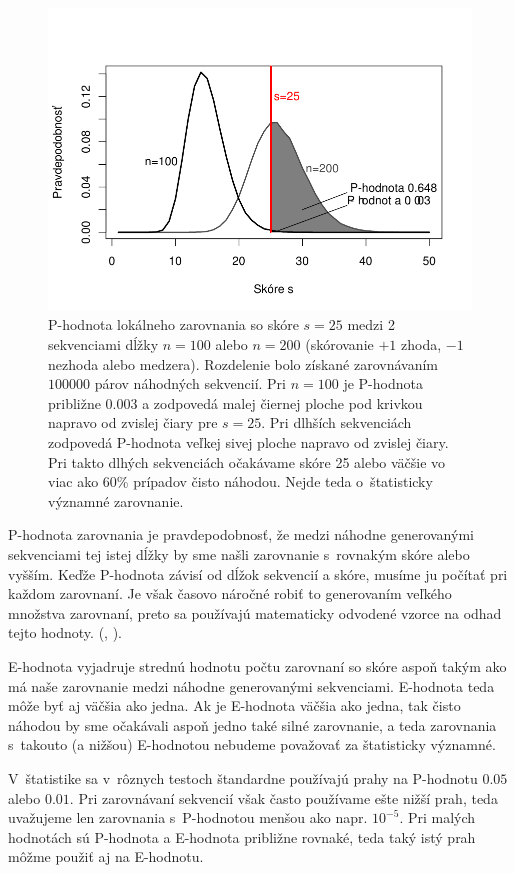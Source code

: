 \begin{figure}[htp]
    \centering
    \includegraphics[width=.9\textwidth]{images/p-value}
    \caption[P-hodnota lokálneho zarovnania]{P-hodnota lokálneho zarovnania so skóre $s = 25$ medzi 2 sekvenciami dĺžky $n = 100$ alebo $n = 200$ (skórovanie $+1$ zhoda, $-1$ nezhoda alebo medzera). Rozdelenie bolo získané zarovnávaním $100000$ párov náhodných sekvencií. Pri $n=100$ je P-hodnota približne 0.003 a zodpovedá malej čiernej ploche pod krivkou napravo od zvislej čiary pre $s=25$. Pri dlhších sekvenciách zodpovedá P-hodnota veľkej sivej ploche napravo od zvislej čiary. Pri takto dlhých sekvenciách očakávame skóre 25 alebo väčšie vo viac ako 60\% prípadov čisto náhodou. Nejde teda o~štatisticky významné zarovnanie.}
    \label{fig:p-value}
\end{figure}

P-hodnota zarovnania je pravdepodobnosť, že medzi náhodne generovanými sekvenciami tej istej dĺžky by sme našli zarovnanie s~rovnakým skóre alebo vyšším. Keďže P-hodnota závisí od dĺžok sekvencií a skóre, musíme ju počítať pri každom zarovnaní. Je však časovo náročné robiť to generovaním veľkého množstva zarovnaní, preto sa používajú matematicky odvodené vzorce na odhad tejto hodnoty. (\cite{Karlin}, \cite{Mitrophanov}).

E-hodnota vyjadruje strednú hodnotu počtu zarovnaní so skóre aspoň takým ako má naše zarovnanie medzi náhodne generovanými sekvenciami. E-hodnota teda môže byť aj väčšia ako jedna. Ak je E-hodnota väčšia ako jedna, tak čisto náhodou by sme očakávali aspoň jedno také silné zarovnanie, a teda zarovnania s~takouto (a nižšou) E-hodnotou nebudeme považovať za štatisticky významné.

V~štatistike sa v~rôznych testoch štandardne používajú prahy na P-hodnotu $0.05$ alebo $0.01$.
Pri zarovnávaní sekvencií však často používame ešte nižší prah, teda uvažujeme len zarovnania s~P-hodnotou menšou ako napr. $10^{-5}$. Pri malých hodnotách sú P-hodnota a E-hodnota približne rovnaké, teda taký istý prah môžme použiť aj na E-hodnotu.
